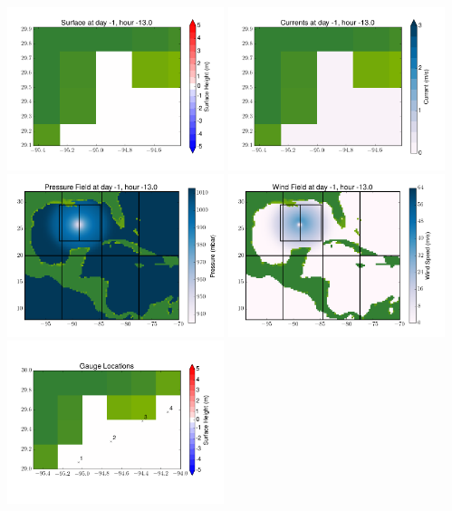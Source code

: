 \documentclass[11pt]{article}
\begin{document}
\includegraphics[width=0.475\textwidth]{frame0035fig6.png}
\vskip 10pt 
\includegraphics[width=0.475\textwidth]{frame0035fig7.png}
\includegraphics[width=0.475\textwidth]{frame0035fig8.png}
\vskip 10pt 
\includegraphics[width=0.475\textwidth]{frame0035fig9.png}
\includegraphics[width=0.475\textwidth]{frame0035fig10.png}
\end{document}
